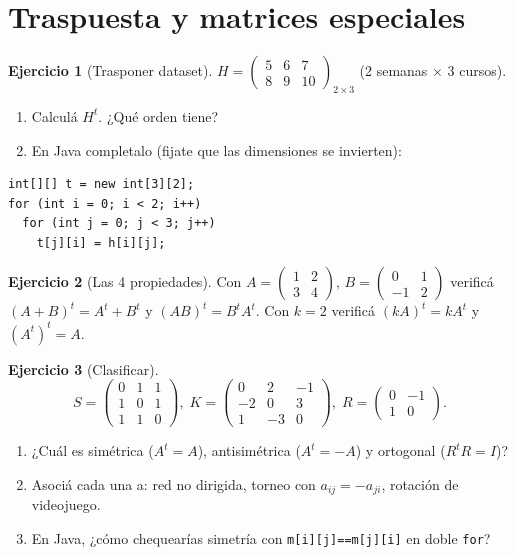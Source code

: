 \documentclass[a4paper,12pt]{article}
\theoremstyle{definition}
\newtheorem{ejercicio}{Ejercicio}[section]
\begin{document}
\section{Traspuesta y matrices especiales}
\begin{ejercicio}[Trasponer dataset]
$H=\begin{pmatrix} 5 & 6 & 7 \\ 8 & 9 & 10 \end{pmatrix}_{2 \times 3}$ (2 semanas $\times$ 3 cursos).
\begin{enumerate}[label=\alph*)]
\item Calculá $H^t$. ¿Qué orden tiene?
\item En Java completalo (fijate que las dimensiones se invierten):
\end{enumerate}
\begin{lstlisting}
int[][] t = new int[3][2];
for (int i = 0; i < 2; i++)
  for (int j = 0; j < 3; j++)
    t[j][i] = h[i][j];
\end{lstlisting}
\end{ejercicio}

\begin{ejercicio}[Las 4 propiedades]
Con $A=\begin{pmatrix} 1 & 2 \\ 3 & 4 \end{pmatrix}$, $B=\begin{pmatrix} 0 & 1 \\ -1 & 2 \end{pmatrix}$ verificá $(A+B)^t=A^t+B^t$ y $(AB)^t=B^tA^t$. Con $k=2$ verificá $(kA)^t=kA^t$ y $(A^t)^t=A$.
\end{ejercicio}

\begin{ejercicio}[Clasificar]
\[
S=\begin{pmatrix} 0 & 1 & 1 \\ 1 & 0 & 1 \\ 1 & 1 & 0 \end{pmatrix}, \;
K=\begin{pmatrix} 0 & 2 & -1 \\ -2 & 0 & 3 \\ 1 & -3 & 0 \end{pmatrix}, \;
R=\begin{pmatrix} 0 & -1 \\ 1 & 0 \end{pmatrix}.
\]
\begin{enumerate}[label=\alph*)]
\item ¿Cuál es simétrica ($A^t=A$), antisimétrica ($A^t=-A$) y ortogonal ($R^tR=I$)?
\item Asociá cada una a: red no dirigida, torneo con $a_{ij}=-a_{ji}$, rotación de videojuego.
\item En Java, ¿cómo chequearías simetría con \texttt{m[i][j]==m[j][i]} en doble \texttt{for}?
\end{enumerate}
\end{ejercicio}
\end{document}
